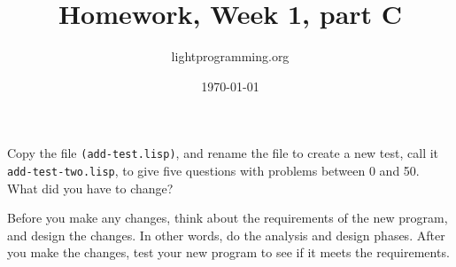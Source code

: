 \documentclass{article}
\title{Homework, Week 1, part C}
\author{lightprogramming.org}
\date{\today}
\begin{document}
\maketitle{}

Copy the file \texttt{(add-test.lisp)}, and rename the file to create a new test, call it \texttt{add-test-two.lisp}, to give five questions with problems between 0 and 50. What did you have to change?

 Before you make any changes, think about the requirements of the new program, and design the changes. In other words, do the analysis and design phases. After you make the changes, test your new program to see if it meets the requirements.
\end{document}
